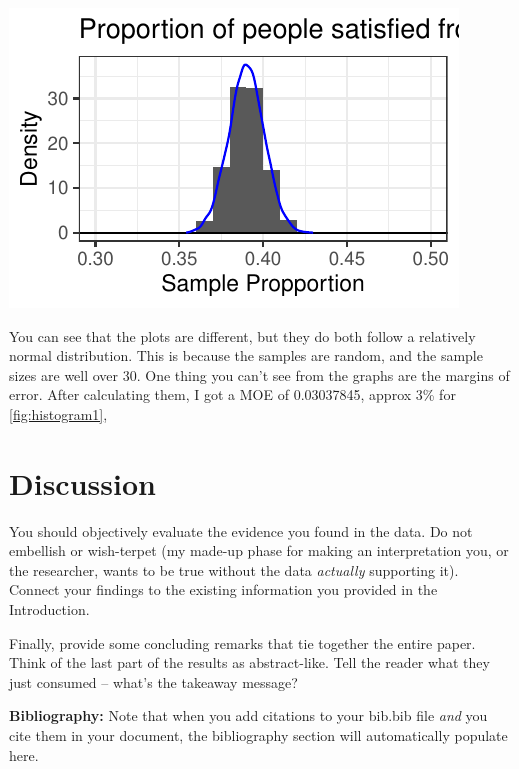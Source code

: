 \documentclass{article}\usepackage[]{graphicx}\usepackage[]{xcolor}
\newenvironment{Figure}
  {\par\medskip\noindent\minipage{\linewidth}}
  {\endminipage\par\medskip}
\begin{document}
\begin{multicols}{2}
\begin{Figure}
\includegraphics{Histogram2.pdf}
 \label{fig:histogram2}
\end{Figure}

You can see that the plots are different, but they do both follow a relatively normal distribution. This is because the samples are random, and the sample sizes are well over 30. One thing you can't see from the graphs are the margins of error. After calculating them, I got a MOE of 0.03037845, approx 3\% for \ref{fig:histogram1}, 

\section{Discussion}
 You should objectively evaluate the evidence you found in the data. Do not embellish or wish-terpet (my made-up phase for making an interpretation you, or the researcher, wants to be true without the data \emph{actually} supporting it). Connect your findings to the existing information you provided in the Introduction.

Finally, provide some concluding remarks that tie together the entire paper. Think of the last part of the results as abstract-like. Tell the reader what they just consumed -- what's the takeaway message?

\vspace{2em}

\noindent\textbf{Bibliography:} Note that when you add citations to your bib.bib file \emph{and}
you cite them in your document, the bibliography section will automatically populate here.

\begin{tiny}

\end{tiny}
\end{multicols}
\end{document}
